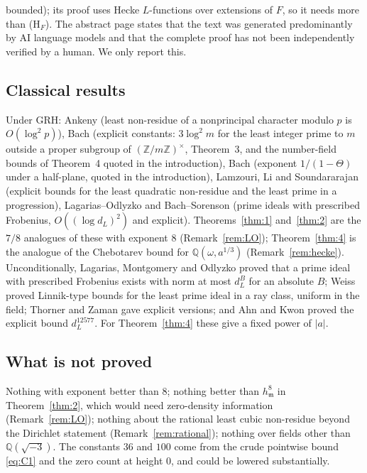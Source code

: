 \documentclass[11pt]{article}
\theoremstyle{definition}
\theoremstyle{remark}
\numberwithin{equation}{section}
\newcommand{\Q}{\mathbb Q}
\newcommand{\Z}{\mathbb Z}
\newcommand{\fm}{\mathfrak m}
\newcommand{\HF}{\textup{(H$_F$)}}
\begin{document}
bounded); its proof uses Hecke $L$-functions over extensions of $F$, so it needs more than \HF. The abstract page states that the text was generated predominantly by AI language models and that the complete proof has not been independently verified by a human. We only report this.

\subsection{Classical results}\label{sec:classical}
Under GRH: Ankeny \cite{ankeny1952} (least non-residue of a nonprincipal character modulo $p$ is $O(\log^2p)$), Bach \cite{bach1990} (explicit constants: $3\log^2m$ for the least integer prime to $m$ outside a proper subgroup of $(\Z/m\Z)^\times$, Theorem~3, and the number-field bounds of Theorem~4 quoted in the introduction), Bach \cite{bach1982} (exponent $1/(1-\Theta)$ under a half-plane, quoted in the introduction), Lamzouri, Li and Soundararajan \cite{lls2015} (explicit bounds for the least quadratic non-residue and the least prime in a progression), Lagarias--Odlyzko \cite{lo1977} and Bach--Sorenson \cite{bs1996} (prime ideals with prescribed Frobenius, $O((\log d_L)^2)$ and explicit). Theorems~\ref{thm:1} and~\ref{thm:2} are the $7/8$ analogues of these with exponent $8$ (Remark~\ref{rem:LO}); Theorem~\ref{thm:4} is the analogue of the Chebotarev bound for $\Q(\omega,a^{1/3})$ (Remark~\ref{rem:hecke}). Unconditionally, Lagarias, Montgomery and Odlyzko \cite{lmo1979} proved that a prime ideal with prescribed Frobenius exists with norm at most $d_L^{B}$ for an absolute $B$; Weiss \cite{weiss1983} proved Linnik-type bounds for the least prime ideal in a ray class, uniform in the field; Thorner and Zaman \cite{tz2017} gave explicit versions; and Ahn and Kwon \cite{ahnkwon2019} proved the explicit bound $d_L^{12577}$. For Theorem~\ref{thm:4} these give a fixed power of $|a|$.

\subsection{What is not proved}\label{sec:notproved}
Nothing with exponent better than $8$; nothing better than $h_\fm^8$ in Theorem~\ref{thm:2}, which would need zero-density information (Remark~\ref{rem:LO}); nothing about the rational least cubic non-residue beyond the Dirichlet statement (Remark~\ref{rem:rational}); nothing over fields other than $\Q(\sqrt{-3})$. The constants $36$ and $100$ come from the crude pointwise bound \eqref{eq:C1} and the zero count at height $0$, and could be lowered substantially.
\end{document}
